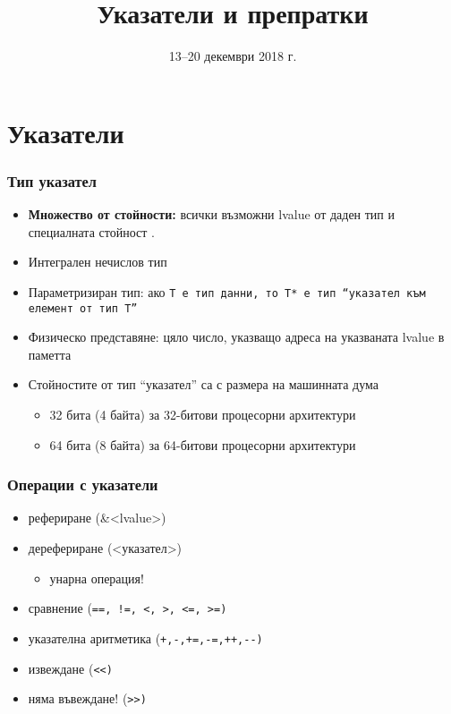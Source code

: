 \documentclass[alsotrans]{beamerswitch}
\title{Указатели и препратки}
\date{13--20 декември 2018 г.}
\begin{document}
\begin{frame}
  \titlepage
\end{frame}

\section{Указатели}

\begin{frame}
  \frametitle{Тип указател}

  \begin{itemize}
  \item \textbf{Множество от стойности:} всички възможни lvalue от даден тип и специалната стойност .
  \item Интегрален \alert{нечислов} тип
  \item Параметризиран тип: ако \tt T е тип данни, то \tt{T*} е тип ``указател към елемент от тип \tt T''
  \item Физическо представяне: цяло число, указващо адреса на указваната lvalue в паметта
  \item Стойностите от тип ``указател'' са с размера на машинната дума
    \begin{itemize}
    \item 32 бита (4 байта) за 32-битови процесорни архитектури
    \item 64 бита (8 байта) за 64-битови процесорни архитектури
    \end{itemize}
  \end{itemize}
\end{frame}

\begin{frame}
  \frametitle{Операции с указатели}

  \begin{itemize}
  \item рефериране (\tta\&<lvalue>)
  \item дерефериране (\tta*<указател>)
    \begin{itemize}
    \item \alert{унарна операция!}
    \end{itemize}
  \item сравнение (\tt{==}, \tt{!=}, \tt<, \tt>, \tt{<=}, \tt{>=})
  \item указателна аритметика (\tt+,\tt-,\tt{+=},\tt{-=},\tt{++},\tt{-{}-})
  \item извеждане (\tt{<{}<})
  \item \alert{няма въвеждане! (\tt{>{}>})}
  \end{itemize}
\end{frame}
\end{document}
